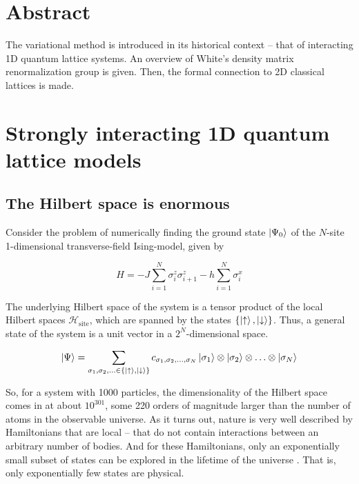 \section{Abstract}

The variational method is introduced in its historical context -- that of
interacting 1D quantum lattice systems. An overview of White's density
matrix renormalization group \cite{white1992density} is given. Then, the
formal connection to 2D classical lattices is made.

\section{Strongly interacting 1D quantum lattice models}

\subsection{The Hilbert space is enormous}

Consider the problem of numerically finding the ground state $\ket{\Psi_0}$ of the
$N$-site 1-dimensional transverse-field Ising-model, given by

\begin{equation} 
  H = -J \sum_{i = 1}^{N} \sigma_{i}^{z}\sigma_{i+1}^{z}
  - h \sum_{i=1}^{N} \sigma_{i}^{x}
\end{equation}

The underlying Hilbert space of the system is a tensor product of the
local Hilbert spaces $\mathcal{H}_{\text{site}}$, which are spanned by the
states $\{\ket{\uparrow}, \ket{\downarrow}\}$. Thus, a general state of the system is a unit vector in
a $2^N$-dimensional space.

\begin{equation}
  \ket{\Psi} = \sum_{\sigma_1, \sigma_2, \ldots \in \{\ket{\uparrow}, \ket{\downarrow}\}} c_{\sigma_1, \sigma_2, \ldots, \sigma_N} \ket{\sigma_1} \otimes \ket{\sigma_2} \otimes \ldots \otimes \ket{\sigma_N}
\end{equation}

So, for a system with 1000 particles, the dimensionality of the Hilbert
space comes in at about $10^{301}$, some 220 orders of magnitude larger than
the number of atoms in the observable universe. As it turns out, nature is
very well described by Hamiltonians that are local -- that do not contain
interactions between an arbitrary number of bodies. And for these
Hamiltonians, only an exponentially small subset of states can be explored
in the lifetime of the universe \cite{poulin2011quantum}. That is, only
exponentially few states are physical. 


